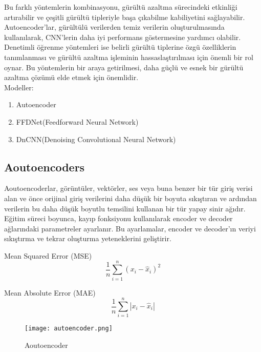 \documentclass{article}
\begin{document}
 \noindent Bu farklı yöntemlerin kombinasyonu, gürültü azaltma sürecindeki etkinliği artırabilir ve çeşitli gürültü tipleriyle başa çıkabilme kabiliyetini sağlayabilir. Autoencoder'lar, gürültülü verilerden temiz verilerin oluşturulmasında kullanılarak, CNN'lerin daha iyi performans göstermesine yardımcı olabilir. Denetimli öğrenme yöntemleri ise belirli gürültü tiplerine özgü özelliklerin tanımlanması ve gürültü azaltma işleminin hassaslaştırılması için önemli bir rol oynar. Bu yöntemlerin bir araya getirilmesi, daha güçlü ve esnek bir gürültü azaltma çözümü elde etmek için önemlidir.\\[5pt]


 \noindent Modeller:
\begin{enumerate}
    \item Autoencoder
    \item FFDNet(Feedforward Neural Network)
    \item DnCNN(Denoising Convolutional Neural Network)
    
\end{enumerate}

\newpage
\subsection{Aoutoencoders}

\noindent Aoutoencoderlar, görüntüler, vektörler, ses veya buna benzer bir tür giriş verisi alan ve önce orijinal giriş verilerini daha düşük bir boyuta sıkıştıran ve ardından verilerin bu daha düşük boyutlu temsilini kullanan bir tür yapay sinir ağıdır.
Eğitim süreci boyunca, kayıp fonksiyonu kullanılarak encoder ve decoder ağlarındaki parametreler ayarlanır. Bu ayarlamalar, encoder ve decoder'ın veriyi sıkıştırma ve tekrar oluşturma yeteneklerini geliştirir.\vspace{1 cm}

Mean Squared Error (MSE) 
\begin{equation}
    \frac{1}{n} \sum_{i=1}^{n} (x_{i} - \hat{x}_{i})^2
\end{equation}

Mean Absolute Error (MAE)
\begin{equation}
    \frac{1}{n} \sum_{i=1}^{n} |x_{i} - \hat{x}_{i}|
\end{equation}

\renewcommand{\figurename}{Şekil}

\begin{figure}[htbp]
     \centering
\texttt{[image: autoencoder.png]}\centering 
  \caption{Aoutoencoder\cite{Autoencoder}}
  \label{fig:resim_etiketi}
\end{figure}
\end{document}
